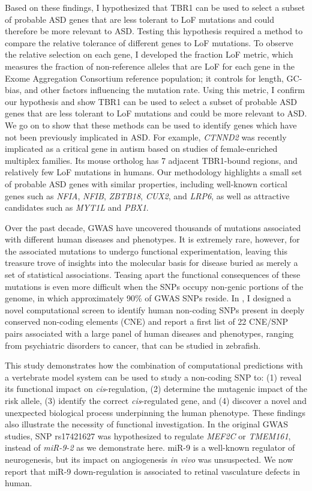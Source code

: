 Based on these findings, I hypothesized that TBR1 can be used to select a subset of probable ASD genes that are less tolerant to LoF mutations and could therefore be more relevant to ASD. Testing this hypothesis required a method to compare the relative tolerance of different genes to LoF mutations. To observe the relative selection on each gene, I developed the fraction LoF metric, which measures the fraction of non-reference alleles that are LoF for each gene in the Exome Aggregation Consortium reference population; it controls for length, GC-bias, and other factors influencing the mutation rate. Using this metric, I confirm our hypothesis and show TBR1 can be used to select a subset of probable ASD genes that are less tolerant to LoF mutations and could be more relevant to ASD. We go on to show that these methods can be used to identify genes which have not been previously implicated in ASD. For example, \emph{CTNND2} was recently implicated as a critical gene in autism based on studies of female-enriched multiplex families. Its mouse ortholog has 7 adjacent TBR1-bound regions, and relatively few LoF mutations in humans. Our methodology highlights a small set of probable ASD genes with similar properties, including well-known cortical genes such as \emph{NFIA}, \emph{NFIB}, \emph{ZBTB18}, \emph{CUX2}, and \emph{LRP6}, as well as attractive candidates such as \emph{MYT1L} and \emph{PBX1}.

Over the past decade, GWAS have uncovered thousands of mutations associated with different human diseases and phenotypes. It is extremely rare, however, for the associated mutations to undergo functional experimentation, leaving this treasure trove of insights into the molecular basis for disease buried as merely a set of statistical associations. Teasing apart the functional consequences of these mutations is even more difficult when the SNPs occupy non-genic portions of the genome, in which approximately 90\% of GWAS SNPs reside. In , I designed a novel computational screen to identify human non-coding SNPs present in deeply conserved non-coding elements (CNE) and report a first list of 22 CNE/SNP pairs associated with a large panel of human diseases and phenotypes, ranging from psychiatric disorders to cancer, that can be studied in zebrafish.

This study demonstrates how the combination of computational predictions with a vertebrate model system can be used to study a non-coding SNP to: (1) reveal its functional impact on \emph{cis}-regulation, (2) determine the mutagenic impact of the risk allele, (3) identify the correct \emph{cis}-regulated gene, and (4) discover a novel and unexpected biological process underpinning the human phenotype. These findings also illustrate the necessity of functional investigation. In the original GWAS studies, SNP rs17421627 was hypothesized to regulate \emph{MEF2C} or \emph{TMEM161}, instead of \emph{miR-9-2} as we demonstrate here. miR-9 is a well-known regulator of neurogenesis, but its impact on angiogenesis \emph{in vivo} was unsuspected. We now report that miR-9 down-regulation is associated to retinal vasculature defects in human.

